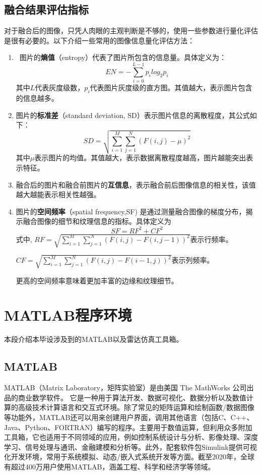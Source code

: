\documentclass{xduugthesis}
\begin{document}
\subsection{融合结果评估指标}
对于融合后的图像，只凭人肉眼的主观判断是不够的，使用一些参数进行量化评估是很有必要的。以下介绍一些常用的图像信息量化评估方法\cite{Eval}：\par
\begin{enumerate}
\item 图片的\textbf{熵值}（entropy）代表了图片所包含的信息量。具体定义为：
$$EN=-\sum_{i=0}^{L-1}p_ilog_2p_i$$
其中$L$代表灰度级数，$p_i$代表图片灰度级的直方图。其值越大，表示图片包含的信息越多。\par
\item 图片的\textbf{标准差}（standard deviation, SD）表示图片信息的离散程度，其公式如下：
$$SD=\sqrt{\sum_{i=1}^{M}\sum_{j=1}^{N}(F(i,j)-\mu)^2}$$
其中$\mu$表示图片的均值。其值越大，表示数据离散程度越高，图片越能突出表示特征。
\item 融合后的图片和融合前图片的\textbf{互信息}，表示融合前后图像信息的相关性，该值越大越能表示相关性越强。
\item 图片的\textbf{空间频率}（spatial frequency,SF) 是通过测量融合图像的梯度分布，揭示融合图像的细节和纹理信息的指标。具体定义为
$$SF = RF^2 + CF^2$$
式中, $RF = \sqrt{\sum_{i=1}^{M}\sum_{j=1}^{N}(F(i,j)-F(i,j-1))^2}$表示行频率。\par
$CF = \sqrt{\sum_{i=1}^{M}\sum_{j=1}^{N}(F(i,j)-F(i-1,j))^2}$表示列频率。\par
更高的空间频率意味着更加丰富的边缘和纹理细节。
\end{enumerate}
\section{MATLAB程序环境}
本段介绍本毕设涉及到的MATLAB以及雷达仿真工具箱。
\subsection{MATLAB}
MATLAB（Matrix Laboratory，矩阵实验室）是由美国 The MathWorks 公司出品的商业数学软件。
它是一种用于算法开发、数据可视化、数据分析以及数值计算的高级技术计算语言和交互式环境。除了常见的矩阵运算和绘制函数/数据图像等功能外，MATLAB还可以用来创建用户界面，调用其他语言（包括C、C++、Java、Python、FORTRAN）编写的程序。主要用于数值运算，但利用众多附加工具箱，它也适用于不同领域的应用，例如控制系统设计与分析、影像处理、深度学习、信号处理与通讯、金融建模和分析等。此外，配套软件包Simulink提供可视化开发环境，常用于系统模拟、动态/嵌入式系统开发等方面。截至2020年，全球有超过400万用户使用MATLAB，涵盖工程、科学和经济学等领域。
\end{document}
